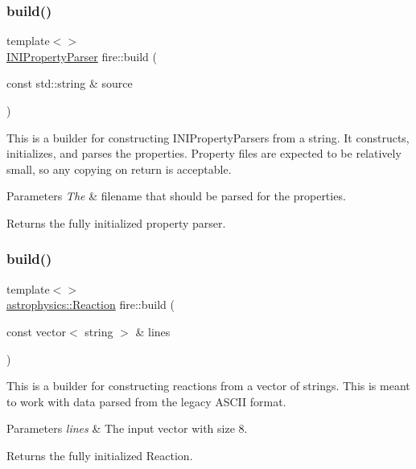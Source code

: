 \subsubsection{\texorpdfstring{build()}{build()}\hspace{0.1cm}{\footnotesize\ttfamily [5/6]}}
{\footnotesize\ttfamily template$<$$>$ \\
\hyperlink{a00766}{I\+N\+I\+Property\+Parser} fire\+::build (\begin{DoxyParamCaption}\item[{const std\+::string \&}]{source }\end{DoxyParamCaption})}

This is a builder for constructing I\+N\+I\+Property\+Parsers from a string. It constructs, initializes, and parses the properties. Property files are expected to be relatively small, so any copying on return is acceptable. 
\begin{DoxyParams}{Parameters}
{\em The} & filename that should be parsed for the properties. \\
\hline
\end{DoxyParams}
\begin{DoxyReturn}{Returns}
the fully initialized property parser. 
\end{DoxyReturn}
\mbox{\label{a00171_abca66b4f2a1543308b663714bd8b4855}} 
\subsubsection{\texorpdfstring{build()}{build()}\hspace{0.1cm}{\footnotesize\ttfamily [6/6]}}
{\footnotesize\ttfamily template$<$$>$ \\
\hyperlink{a00734}{astrophysics\+::\+Reaction} fire\+::build (\begin{DoxyParamCaption}\item[{const vector$<$ string $>$ \&}]{lines }\end{DoxyParamCaption})}

This is a builder for constructing reactions from a vector of strings. This is meant to work with data parsed from the legacy A\+S\+C\+II format. 
\begin{DoxyParams}{Parameters}
{\em lines} & The input vector with size 8. \\
\hline
\end{DoxyParams}
\begin{DoxyReturn}{Returns}
the fully initialized Reaction. 
\end{DoxyReturn}
\mbox{\label{a00171_afad7faa08ea9d4ad30b439b1d1719dd9}} 
